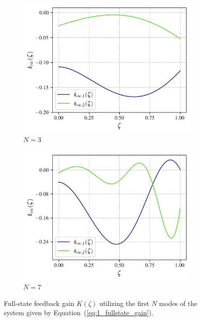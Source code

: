 \begin{figure}[!htbp]
    \centering
    \begin{subfigure}[b]{0.48\textwidth}
        \centering
        \includegraphics[width=\textwidth]{papers/1_optimal/figures/k_3.png}
        \caption{$N = 3$}
        \label{fig:1_k_3}
    \end{subfigure}
    \hfill
    \begin{subfigure}[b]{0.48\textwidth}
        \centering
        \includegraphics[width=\textwidth]{papers/1_optimal/figures/k_7.png}
        \caption{$N = 7$}
        \label{fig:1_k_7}
    \end{subfigure}
    \caption{Full-state feedback gain ${K}(\zeta)$ utilizing the first $N$ modes of the system given by Equation~(\ref{eq:1_fullstate_gain}).}
    \label{fig:1_k_modes}
\end{figure}

